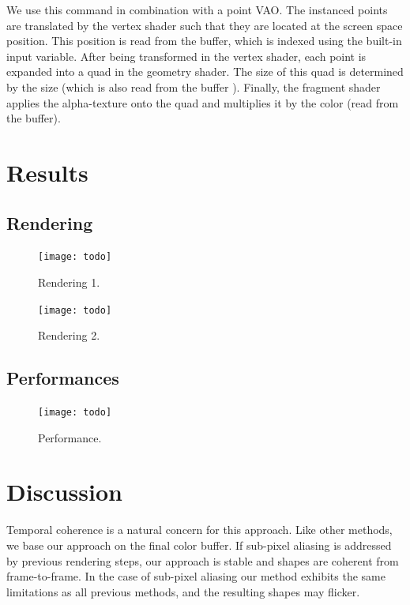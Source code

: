 We use this command in combination with a point VAO. The instanced points are translated by the vertex shader such that they are located at the screen space \bokeh position. This position is read from the  buffer, which is indexed using the built-in  input variable. After being transformed in the vertex shader, each point is expanded into a quad in the geometry shader. The size of this quad is determined by the \bokeh size (which is also read from the  buffer ). Finally, the fragment shader applies the \bokeh alpha-texture onto the quad and multiplies it by the \bokeh color (read from the  buffer).

\section{Results}

\subsection{Rendering}
	\begin{figure}[htb]\centering
	\texttt{[image: todo]}
	\caption{Rendering 1.}
	\label{YourName:fig1}
	\end{figure}

	\begin{figure}[htb]\centering
	\texttt{[image: todo]}
	\caption{Rendering 2.}
	\label{YourName:fig1}
	\end{figure}

\subsection{Performances}
	\begin{figure}[htb]\centering
	\texttt{[image: todo]}
	\caption{Performance.}
	\label{YourName:fig1}
	\end{figure}

\section{Discussion}
Temporal coherence is a natural concern for this approach. Like other methods, we base our approach on the final color buffer. If sub-pixel aliasing is addressed by previous rendering steps, our approach is stable and \bokeh shapes are coherent from frame-to-frame. In the case of sub-pixel aliasing our method exhibits the same limitations as all previous methods, and the resulting \bokeh shapes may flicker.

